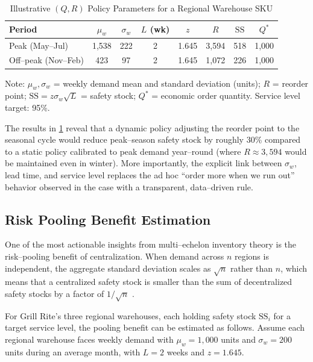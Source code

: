 \documentclass[12pt,a4paper]{article}
\begin{document}
\begin{table}[H]
  \centering
  \caption{Illustrative $(Q, R)$ Policy Parameters for a Regional Warehouse SKU}
  \label{tab:qr_policy}
  \begin{tabular}{lccccccc}
    \toprule
    Period & $\mu_w$ & $\sigma_w$ & $L$ (wk) & $z$ & $R$ & $\text{SS}$ & $Q^*$ \\
    \midrule
    Peak (May--Jul)   & 1{,}538 & 222 & 2 & 1.645 & 3{,}594 & 518 & 1{,}000 \\
    Off--peak (Nov--Feb) & 423  & 97  & 2 & 1.645 & 1{,}072 & 226 & 1{,}000 \\
    \bottomrule
  \end{tabular}

  \vspace{0.3em}
  \footnotesize{Note: $\mu_w, \sigma_w$ = weekly demand mean and standard deviation (units); $R$ = reorder point; $\text{SS} = z\sigma_w\sqrt{L}$ = safety stock; $Q^*$ = economic order quantity. Service level target: 95\%.}
\end{table}

The results in \cref{tab:qr_policy} reveal that a dynamic policy adjusting the reorder point to the seasonal cycle would reduce peak--season safety stock by roughly 30\% compared to a static policy calibrated to peak demand year--round (where $R \approx 3{,}594$ would be maintained even in winter). More importantly, the explicit link between $\sigma_w$, lead time, and service level replaces the ad hoc ``order more when we run out'' behavior observed in the case with a transparent, data--driven rule.

\subsection{Risk Pooling Benefit Estimation}

One of the most actionable insights from multi--echelon inventory theory is the risk--pooling benefit of centralization. When demand across $n$ regions is independent, the aggregate standard deviation scales as $\sqrt{n}$ rather than $n$, which means that a centralized safety stock is smaller than the sum of decentralized safety stocks by a factor of $1/\sqrt{n}$ \citep{eppen1979effects,simchilevi2008supplychain,chopra2016supplychain}.

For Grill Rite's three regional warehouses, each holding safety stock $\text{SS}_i$ for a target service level, the pooling benefit can be estimated as follows. Assume each regional warehouse faces weekly demand with $\mu_w = 1{,}000$ units and $\sigma_w = 200$ units during an average month, with $L = 2$ weeks and $z = 1.645$.
\end{document}
